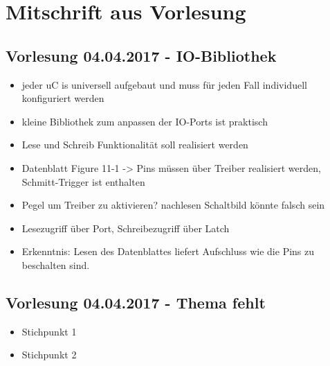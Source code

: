 \section{Mitschrift aus Vorlesung}
\subsection{Vorlesung 04.04.2017 - IO-Bibliothek}

\begin{itemize}%
		\item jeder uC is universell aufgebaut und muss für jeden Fall individuell konfiguriert werden
		\item kleine Bibliothek zum anpassen der IO-Ports ist praktisch
		\item Lese und Schreib Funktionalität soll realisiert werden
		\item Datenblatt Figure 11-1 -> Pins müssen über Treiber realisiert werden, Schmitt-Trigger ist enthalten
		\item Pegel um Treiber zu aktivieren? nachlesen Schaltbild könnte falsch sein
		\item Lesezugriff über Port, Schreibezugriff über Latch
		\item Erkenntnis: Lesen des Datenblattes liefert Aufschluss wie die Pins zu beschalten sind. 
		
\end{itemize}

\subsection{Vorlesung 04.04.2017 - Thema fehlt}

\begin{itemize}%
	\item Stichpunkt 1
	\item Stichpunkt 2
\end{itemize}
